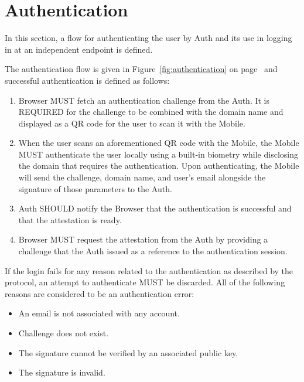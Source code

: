 \section{Authentication}
In this section, a flow for authenticating the user by Auth and its use in logging in at an independent endpoint
is defined.
\medskip

The authentication flow is given in Figure~\ref{fig:authentication} on page~\pageref{fig:authentication} and 
successful authentication is defined as follows:
    \begin{enumerate}
        \item Browser MUST fetch an authentication challenge from the Auth. It is REQUIRED for the challenge 
                to be combined with the domain name and displayed as a QR code for the user to scan it with 
                the Mobile.
        \item When the user scans an aforementioned QR code with the Mobile, the Mobile MUST authenticate the 
                user locally using a built-in biometry while disclosing the domain that requires the authentication.
                Upon authenticating, the Mobile will send the challenge, domain name, and user's email alongside the
                signature of those parameters to the Auth.
        \item Auth SHOULD notify the Browser that the authentication is successful and that the attestation is
                ready.
        \item Browser MUST request the attestation from the Auth by providing a challenge that the Auth issued 
                as a reference to the authentication session.
    \end{enumerate}
    
If the login fails for any reason related to the authentication as described by the protocol, an attempt to 
authenticate MUST be discarded. All of the following reasons are considered to be an authentication error:
    \begin{itemize}
        \item An email is not associated with any account.
        \item Challenge does not exist.
        \item The signature cannot be verified by an associated public key.
        \item The signature is invalid.
    \end{itemize}

